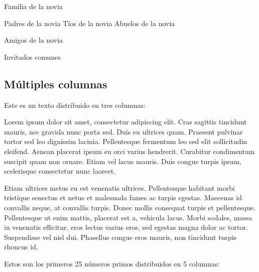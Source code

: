 \documentclass[a4paper,10pt]{article}
\theoremstyle{teorema}
\theoremstyle{plano}
\theoremstyle{titulo}
\begin{document}
Familia de la novia

Padres de la novia
Tíos de la novia
Abuelos de la novia

Amigos de la novia

Invitados comunes


\subsection{Múltiples columnas}

Este es un texto distribuido en tres columnas:

\begin{multicols}{3}

Lorem ipsum dolor sit amet, consectetur adipiscing elit. Cras sagittis tincidunt mauris, nec gravida nunc porta sed. Duis eu ultrices quam. Praesent pulvinar tortor sed leo dignissim lacinia. Pellentesque fermentum leo sed elit sollicitudin eleifend. Aenean placerat ipsum eu orci varius hendrerit. Curabitur condimentum suscipit quam non ornare. Etiam vel lacus mauris. Duis congue turpis ipsum, scelerisque consectetur nunc laoreet.

Etiam ultrices metus eu est venenatis ultrices. Pellentesque habitant morbi tristique senectus et netus et malesuada fames ac turpis egestas. Maecenas id convallis neque, at convallis turpis. Donec mollis consequat turpis et pellentesque. Pellentesque ut enim mattis, placerat est a, vehicula lacus. Morbi sodales, massa in venenatis efficitur, eros lectus varius eros, sed egestas magna dolor ac tortor. Suspendisse vel nisl dui. Phasellus congue eros mauris, non tincidunt turpis rhoncus id.

\end{multicols}

Estos son los primeros 25 números primos distribuidos en 5 columnas:
\end{document}
